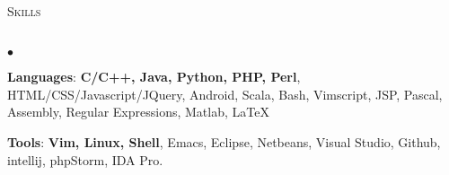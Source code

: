 \documentclass[11pt]{article}
\newcommand{\lineunder}{\vspace*{-8pt} \\ \hspace*{-18pt} \hrulefill \\}
\newcommand{\header}[2]{{\hspace*{-15pt}\vspace*{6pt} \textsc{\large #1}\hfill{\footnotesize #2}} \vspace*{-6pt} \lineunder}
\newenvironment{achievements}{\begin{list}{$\bullet$}{\topsep 0pt \itemsep -2pt}}{\vspace*{4pt}\end{list}}
\begin{document}
\header{Skills}{}
\begin{achievements}
\item \textbf{Languages}: \textbf{C/C++, Java, Python, PHP, Perl}, HTML/CSS/Javascript/JQuery, Android, Scala, Bash,
    Vimscript, JSP, Pascal, Assembly, Regular Expressions, Matlab, \LaTeX
\item \textbf{Tools}: \textbf{Vim, Linux, Shell}, Emacs, Eclipse, Netbeans, Visual Studio, Github, 
    intellij, phpStorm, IDA Pro.
\end{achievements}
\end{document}
